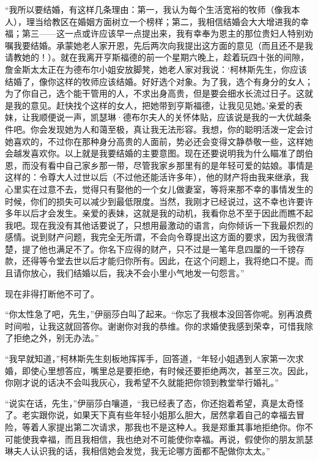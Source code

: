 \par “我所以要结婚，有这样几条理由：第一，我认为每个生活宽裕的牧师（像我本人），理当给教区在婚姻方面树立一个榜样；第二，我相信结婚会大大增进我的幸福；第三——这一点或许应该早一点提出来，我有幸奉为恩主的那位贵妇人特别劝嘱我要结婚。承蒙她老人家开恩，先后两次向我提出这方面的意见（而且还不是我请教她的！）。就在我离开亨斯福德的前一个星期六晚上，趁着玩四十张的间隙，詹金斯太太正在为德布尔小姐安放脚凳，她老人家对我说：‘柯林斯先生，你应该结婚了，像你这样的牧师应该结婚。好好选个对象。为了我，选个有身分的女人；为了你自己，选个能干管用的人，不求出身高贵，但是要会细水长流过日子。这就是我的意见。赶快找个这样的女人，把她带到亨斯福德，让我见见她。’亲爱的表妹，让我顺便说一声，凯瑟琳·德布尔夫人的关怀体贴，应该说是我的一大优越条件吧。你会发现她为人和蔼至极，真让我无法形容。我想，你的聪明活泼一定会讨她喜欢的，不过你在那种身分高贵的人面前，势必还会变得文静恭敬一些，这样她会越发喜欢你。以上就是我要结婚的主要意图。现在还要说明我为什么瞄准了朗伯恩，而没有看中自己家乡那一带，尽管我家乡那里有的是年轻可爱的姑娘。事情是这样的：令尊大人过世以后（不过他还能活许多年），他的财产将由我来继承，我心里实在过意不去，觉得只有娶他的一个女儿做妻室，等将来那不幸的事情发生的时候，你们的损失可以减少到最低限度。当然，我刚才已经说过，这不幸也许要许多年以后才会发生。亲爱的表妹，这就是我的动机，我看你总不至于因此而瞧不起我吧。现在我没有其他话要说了，只想用最激动的语言，向你倾诉一下我最炽烈的感情。说到财产问题，我完全无所谓，不会向令尊提出这方面的要求，因为我很清楚，提了他也满足不了。你名下应得的财产，只不过是一笔年息四厘的一千镑存款，还得等令堂去世以后才能归你所有。因此，在这个问题上，我将绝口不提。而且请你放心，我们结婚以后，我决不会小里小气地发一句怨言。”
\par 现在非得打断他不可了。
\par “你太性急了吧，先生，”伊丽莎白叫了起来。“你忘了我根本没回答你呢。别再浪费时间啦，让我这就回答你。谢谢你对我的恭维。你的求婚使我感到荣幸，可惜我除了拒绝之外，别无办法。”
\par “我早就知道，”柯林斯先生刻板地挥挥手，回答道，“年轻小姐遇到人家第一次求婚，即使心里想答应，嘴里总是要拒绝，有时候还要拒绝两次，甚至三次。因此，你刚才说的话决不会叫我灰心，我希望不久就能把你领到教堂举行婚礼。”
\par “说实在话，先生，”伊丽莎白嚷道，“我已经表了态，你还抱着希望，真是太奇怪了。老实跟你说，如果天下真有些年轻小姐那么胆大，居然拿着自己的幸福去冒险，等着人家提出第二次请求，那我也不是这种人。我是郑重其事地拒绝你。你不可能使我幸福，而且我相信，我也绝对不可能使你幸福。再说，假使你的朋友凯瑟琳夫人认识我的话，我相信她会发觉，我无论哪方面都不配做你太太。”
